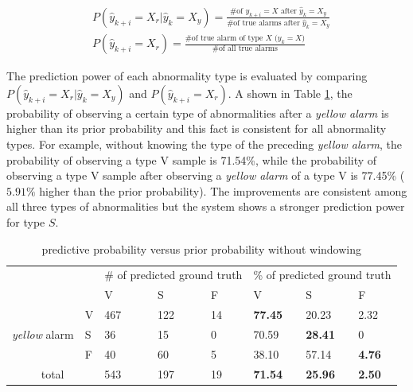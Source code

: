 \begin{align}
\nonumber 
&P(\hat{y}_{k+i}=X_r|\hat{y}_{k}=X_y)=\frac{\text{\# of $y_{k+i}=X$ after $\hat{y}_k=X_y$}}{\text{\# of true alarms after $\hat{y}_k=X_y$}} \\
&P(\hat{y}_{k+i}=X_r)=\frac{\text{\# of true alarm of type $X$ ($y_{k}=X$)}}{\text{\# of all true alarms}} 
\end{align}

The prediction power of each abnormality type is evaluated by comparing $P(\hat{y}_{k+i}=X_r|\hat{y}_{k}=X_y)$ and $P(\hat{y}_{k+i}=X_r)$. A shown in Table \ref{table:pred}, the probability of observing a certain type of abnormalities after a \textit{yellow alarm} is higher than its prior probability and this fact is consistent for all abnormality types. For example, without knowing the type of the preceding \textit{yellow alarm}, the probability of observing a type V sample is 71.54\%, while the probability of observing a type V sample after observing a \textit{yellow alarm} of a type V is 77.45\% ($5.91\%$ higher than the prior probability). The improvements are consistent among all three types of abnormalities but the system shows a stronger prediction power for type $S$. 

\begin{table}[t]
\centering
\caption{predictive probability versus prior probability without windowing}
\label{table:pred}
\begin{tabular}{|c|l|l|l|l||l|l|l|}
\hline
\multicolumn{2}{|l|}{\multirow{2}{*}{}} & \multicolumn{3}{m{8em}|}{\# of predicted ground truth} & \multicolumn{3}{m{8em}|}{\% of predicted ground truth} \\ \cline{3-8} 
\multicolumn{2}{|l|}{}                  & V               & S               & F             & V               & S               & F             \\ \hline
\multirow{3}{2.5em}{\textit{yellow} alarm}    & V    & 467             & 122              & 14            & \textbf{77.45}  & 20.23           & 2.32          \\ \cline{2-8} 
                                 & S    & 36              & 15              & 0             & 70.59           & \textbf{28.41}  & 0             \\ \cline{2-8} 
                                 & F    & 40              & 60              & 5             & 38.10           & 57.14           & \textbf{4.76} \\ \hline
\multicolumn{2}{|c|}{total}             & 543             & 197             & 19            & \textbf{71.54}  & \textbf{25.96}  & \textbf{2.50} \\ \hline
\end{tabular}
\end{table}

